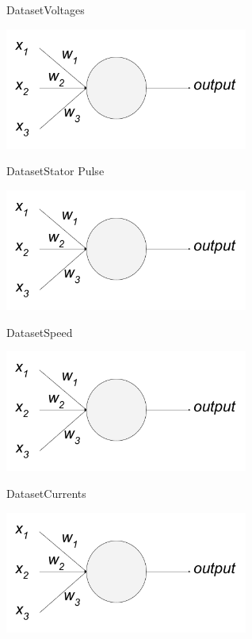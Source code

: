\documentclass[handout]{beamer}
\begin{document}
\begin{frame}{Dataset}{Voltages}
\begin{center}
  \includegraphics[width=0.8\linewidth, height=4cm]{images/perceptron}
\end{center}
\end{frame}

\begin{frame}{Dataset}{Stator Pulse}
\begin{center}
  \includegraphics[width=0.8\linewidth, height=4cm]{images/perceptron}
\end{center}
\end{frame}

\begin{frame}{Dataset}{Speed}
\begin{center}
  \includegraphics[width=0.8\linewidth, height=4cm]{images/perceptron}
\end{center}
\end{frame}

\begin{frame}{Dataset}{Currents}
\begin{center}
  \includegraphics[width=0.8\linewidth, height=4cm]{images/perceptron}
\end{center}
\end{frame}
\end{document}
